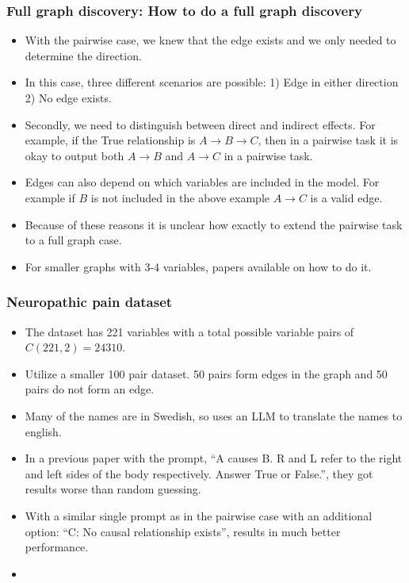 \documentclass{beamer}
\begin{document}
\begin{frame}
	\frametitle{Full graph discovery: How to do a full graph discovery}
	\begin{itemize}
		\item With the pairwise case, we knew that the edge exists and we 
			only needed to determine the direction.
		\item In this case, three different scenarios are possible: 1) Edge in
			either direction 2) No edge exists.
		\item Secondly, we need to distinguish between direct and
			indirect effects. For example, if the True relationship is
			$ A \rightarrow B \rightarrow C $, then in a pairwise task
			it is okay to output both $ A \rightarrow B $ and $ A \rightarrow
			C $ in a pairwise task.
		\item Edges can also depend on which variables are included in the 
			model. For example if $ B $ is not included in the above 
			example $ A \rightarrow C $ is a valid edge.
		\item Because of these reasons it is unclear how exactly to extend the 
			pairwise task to a full graph case.
		\item For smaller graphs with 3-4 variables, papers available on how 
			to do it.
	\end{itemize}
\end{frame}

\begin{frame}
	\frametitle{Neuropathic pain dataset}
	\begin{itemize}
		\item The dataset has 221 variables with a total possible variable 
			pairs of $ C(221, 2) = 24310 $.
		\item Utilize a smaller 100 pair dataset. 50 pairs form edges in the
			graph and 50 pairs do not form an edge.
		\item Many of the names are in Swedish, so uses an LLM to translate 
			the names to english.
		\item In a previous paper with the prompt, ``A causes B. R and L refer
			to the right and left sides of the body respectively. Answer
			True or False.'', they got results worse than random guessing.
		\item With a similar single prompt as in the pairwise case with an 
			additional option: ``C: No causal relationship exists'', results
			in much better performance.
		\item {}
	\end{itemize}
\end{frame}
\end{document}
